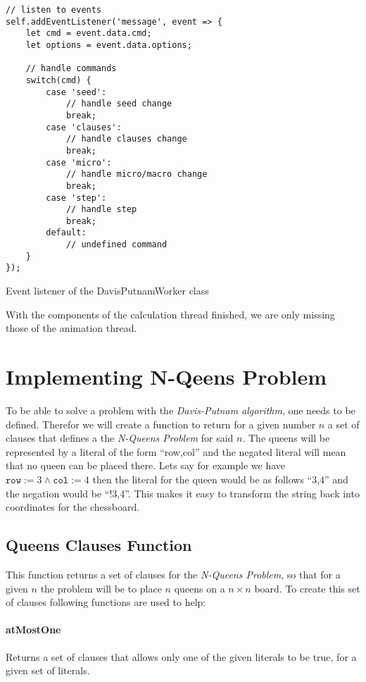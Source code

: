 \begin{listing}[h!]
\begin{verbatim}
// listen to events
self.addEventListener('message', event => {
    let cmd = event.data.cmd;
    let options = event.data.options;

    // handle commands
    switch(cmd) {
        case 'seed':
            // handle seed change
            break;
        case 'clauses':
            // handle clauses change
            break;
        case 'micro':
            // handle micro/macro change
            break;
        case 'step':
            // handle step
            break;
        default:
            // undefined command
    }
});
\end{verbatim}
    \caption{Event listener of the DavisPutnamWorker class}
    \label{code:workerListener}
\end{listing}

With the components of the calculation thread finished, we are only missing those of the animation thread.

\section{Implementing N-Qeens Problem}
\label{sec:impQueens}
To be able to solve a problem with the \textit{Davis-Putnam algorithm}, one needs to be defined. Therefor we will create a function to return for a given number $n$ a set of clauses that defines a the \textit{N-Queens Problem} for said $n$. The queens will be represented by a literal of the form ``row,col'' and the negated literal will mean that no queen can be placed there. Lets say for example we have $\texttt{row} := 3 \land \texttt{col} := 4$ then the literal for the queen would be as follows ``3,4'' and the negation would be ``!3,4''. This makes it easy to transform the string back into coordinates for the chessboard.

\subsection{Queens Clauses Function}
\label{sub:impQueensClauses}
This function returns a set of clauses for the \textit{N-Queens Problem}, so that for a given $n$ the problem will be to place $n$ queens on a $n \times n$ board. To create this set of clauses following functions are used to help:

\paragraph{atMostOne}
Returns a set of clauses that allows only one of the given literals to be true, for a given set of literals.

